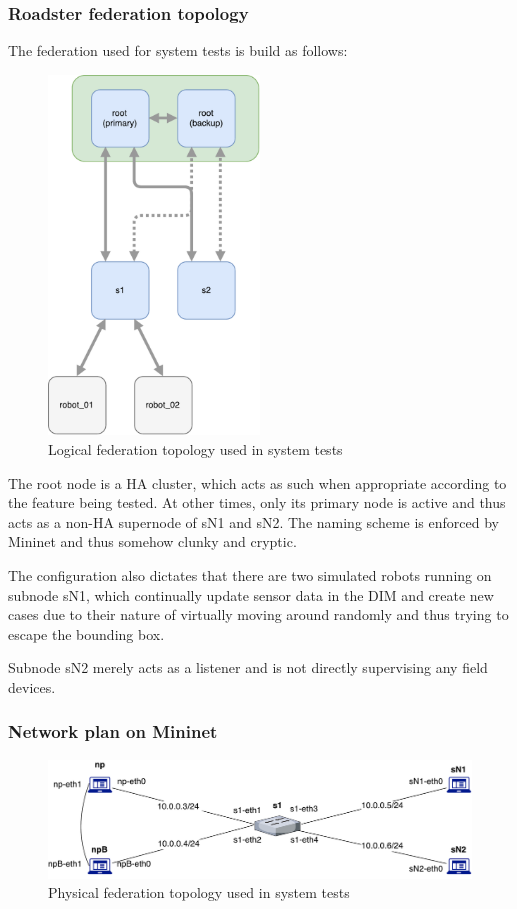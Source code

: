 \subsubsection{Roadster federation topology}
The federation used for system tests is build as follows:
\begin{figure}[]
	\center
	\includegraphics[width=0.5\textwidth]{img/logical_federation_setup.pdf}
	\caption{Logical federation topology used in system tests}
	\label{lst:testing:topo:logic}
\end{figure}

The root node is a HA cluster, which acts as such when appropriate according to
the feature being tested. At other times, only its primary node is active and
thus acts as a non-HA supernode of sN1 and sN2. The naming scheme is enforced
by Mininet and thus somehow clunky and cryptic.

The configuration also dictates that there are two simulated robots running on
subnode sN1, which continually update sensor data in the DIM and create new
cases due to their nature of virtually moving around randomly and thus trying
to escape the bounding box.

Subnode sN2 merely acts as a listener and is not directly supervising any field
devices.

\subsubsection{Network plan on Mininet}
\begin{figure}[]
	\center
	\includegraphics[width=\textwidth]{img/physical_network_mininet.pdf}
	\caption{Physical federation topology used in system tests}
	\label{lst:testing:topo:logic}
\end{figure}

